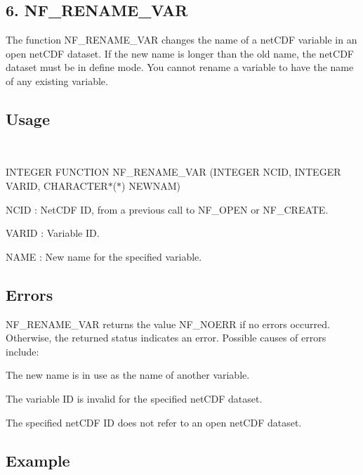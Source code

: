 \subsection*{6. N\+F\+\_\+\+R\+E\+N\+A\+M\+E\+\_\+\+V\+AR }

The function N\+F\+\_\+\+R\+E\+N\+A\+M\+E\+\_\+\+V\+AR changes the name of a net\+C\+DF variable in an open net\+C\+DF dataset. If the new name is longer than the old name, the net\+C\+DF dataset must be in define mode. You cannot rename a variable to have the name of any existing variable.

\subsection*{Usage }

 

I\+N\+T\+E\+G\+ER F\+U\+N\+C\+T\+I\+ON N\+F\+\_\+\+R\+E\+N\+A\+M\+E\+\_\+\+V\+AR (I\+N\+T\+E\+G\+ER N\+C\+ID, I\+N\+T\+E\+G\+ER V\+A\+R\+ID, C\+H\+A\+R\+A\+C\+T\+E\+R$\ast$($\ast$) N\+E\+W\+N\+AM)

{\ttfamily N\+C\+ID} \+: Net\+C\+DF ID, from a previous call to N\+F\+\_\+\+O\+P\+EN or N\+F\+\_\+\+C\+R\+E\+A\+TE.

{\ttfamily V\+A\+R\+ID} \+: Variable ID.

{\ttfamily N\+A\+ME} \+: New name for the specified variable.

\subsection*{Errors }

N\+F\+\_\+\+R\+E\+N\+A\+M\+E\+\_\+\+V\+AR returns the value N\+F\+\_\+\+N\+O\+E\+RR if no errors occurred. Otherwise, the returned status indicates an error. Possible causes of errors include\+:


\begin{DoxyItemize}
\item The new name is in use as the name of another variable.
\item The variable ID is invalid for the specified net\+C\+DF dataset.
\item The specified net\+C\+DF ID does not refer to an open net\+C\+DF dataset.
\end{DoxyItemize}

\subsection*{Example }

